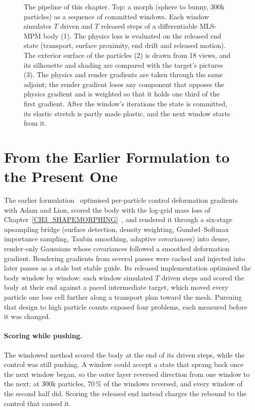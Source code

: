 \begin{figure}[t]
    \centering
    \resizebox{\textwidth}{!}{}
    \caption{The pipeline of this chapter. Top: a morph (sphere to bunny, 300k particles) as a sequence of
    committed windows. Each window simulates $T$ driven and $T$ released steps of a differentiable MLS-MPM body (1).
    The physics loss is evaluated on the released end state (transport, surface proximity, end drift and released
    motion). The exterior surface of the particles (2) is drawn from 18 views, and its silhouette and shading are
    compared with the target's pictures (3). The physics and render gradients are taken through the same adjoint;
    the render gradient loses any component that opposes the physics gradient and is weighted so that it holds one
    third of the first gradient. After the window's iterations the state is committed, its elastic stretch is
    partly made plastic, and the next window starts from it.}
    \label{fig:overview}
\end{figure}

\section{From the Earlier Formulation to the Present One}
\label{ch4:sec_from_earlier}

The earlier formulation~\citep{song2025physmorphgs} optimised per-particle control deformation gradients with Adam
and Lion, scored the body with the log-grid mass loss of Chapter~\ref{CH3_SHAPEMORPHING}~\citep{11088224}, and
rendered it through a six-stage upsampling bridge (surface detection, density weighting, Gumbel--Softmax importance
sampling, Taubin smoothing, adaptive covariances) into dense, render-only Gaussians whose covariances followed a
smoothed deformation gradient. Rendering gradients from several passes were cached and injected into later passes
as a stale but stable guide. Its released implementation optimised the body window by window: each window
simulated $T$ driven steps and scored the body at their end against a paced intermediate target, which moved every
particle one loss cell further along a transport plan toward the mesh. Pursuing that design to high particle counts
exposed four problems, each measured before it was changed.

\paragraph{Scoring while pushing.} The windowed method scored the body at the end of its driven steps, while the
control was still pushing. A window could accept a state that sprang back once the next window began, so the outer
layer reversed direction from one window to the next: at 300k particles, 70\,\% of the windows reversed, and every
window of the second half did. Scoring the released end instead charges the rebound to the control that caused it.

